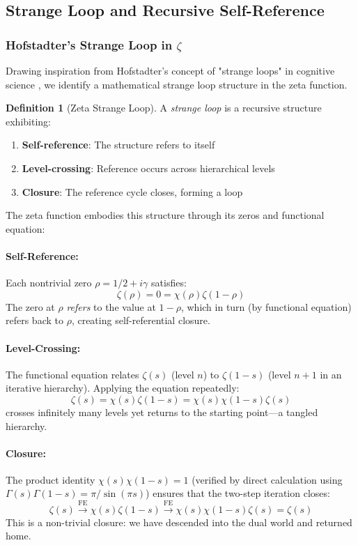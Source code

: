 \documentclass[12pt]{article}
\theoremstyle{plain}
\theoremstyle{definition}
\newtheorem{definition}[theorem]{Definition}
\begin{document}
\subsection{Strange Loop and Recursive Self-Reference}

\subsubsection{Hofstadter's Strange Loop in $\zeta$}

Drawing inspiration from Hofstadter's concept of "strange loops" in cognitive science \cite{hofstadter1979}, we identify a mathematical strange loop structure in the zeta function.

\begin{definition}[Zeta Strange Loop]\label{def:strange_loop}
A \emph{strange loop} is a recursive structure exhibiting:
\begin{enumerate}
\item \textbf{Self-reference}: The structure refers to itself
\item \textbf{Level-crossing}: Reference occurs across hierarchical levels
\item \textbf{Closure}: The reference cycle closes, forming a loop
\end{enumerate}
\end{definition}

The zeta function embodies this structure through its zeros and functional equation:

\paragraph{Self-Reference:}
Each nontrivial zero $\rho = 1/2 + i\gamma$ satisfies:
$$\zeta(\rho) = 0 = \chi(\rho) \zeta(1-\rho)$$
The zero at $\rho$ \emph{refers} to the value at $1-\rho$, which in turn (by functional equation) refers back to $\rho$, creating self-referential closure.

\paragraph{Level-Crossing:}
The functional equation relates $\zeta(s)$ (level $n$) to $\zeta(1-s)$ (level $n+1$ in an iterative hierarchy). Applying the equation repeatedly:
$$\zeta(s) = \chi(s)\zeta(1-s) = \chi(s)\chi(1-s)\zeta(s)$$
crosses infinitely many levels yet returns to the starting point—a tangled hierarchy.

\paragraph{Closure:}
The product identity $\chi(s)\chi(1-s) = 1$ (verified by direct calculation using $\Gamma(s)\Gamma(1-s) = \pi/\sin(\pi s)$) ensures that the two-step iteration closes:
$$\zeta(s) \xrightarrow{\text{FE}} \chi(s)\zeta(1-s) \xrightarrow{\text{FE}} \chi(s)\chi(1-s)\zeta(s) = \zeta(s)$$
This is a non-trivial closure: we have descended into the dual world and returned home.
\end{document}

